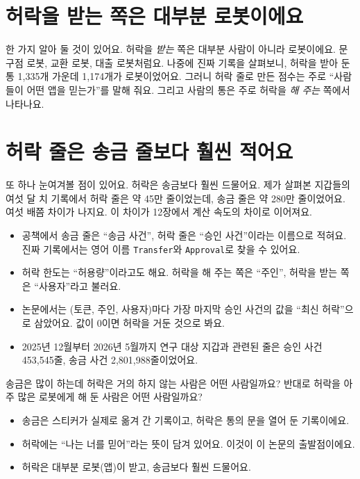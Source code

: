 \section{허락을 받는 쪽은 대부분 로봇이에요}

한 가지 알아 둘 것이 있어요.
허락을 \emph{받는} 쪽은 대부분 사람이 아니라 로봇이에요.
문구점 로봇, 교환 로봇, 대출 로봇처럼요.
나중에 진짜 기록을 살펴보니, 허락을 받아 둔 통 1,335개 가운데 1,174개가 로봇이었어요.
그러니 허락 줄로 만든 점수는 주로 “사람들이 어떤 앱을 믿는가”를 말해 줘요.
그리고 사람의 통은 주로 허락을 \emph{해 주는} 쪽에서 나타나요.

\section{허락 줄은 송금 줄보다 훨씬 적어요}

또 하나 눈여겨볼 점이 있어요.
허락은 송금보다 훨씬 드물어요.
제가 살펴본 지갑들의 여섯 달 치 기록에서 허락 줄은 약 45만 줄이었는데, 송금 줄은 약 280만 줄이었어요.
여섯 배쯤 차이가 나지요.
이 차이가 12장에서 계산 속도의 차이로 이어져요.

\begin{deeper}[진짜 용어]
\begin{itemize}
\item 공책에서 송금 줄은 “송금 사건”, 허락 줄은 “승인 사건”이라는 이름으로 적혀요. 진짜 기록에서는 영어 이름 \texttt{Transfer}와 \texttt{Approval}로 찾을 수 있어요.
\item 허락 한도는 “허용량”이라고도 해요. 허락을 해 주는 쪽은 “주인”, 허락을 받는 쪽은 “사용자”라고 불러요.
\item 논문에서는 (토큰, 주인, 사용자)마다 가장 마지막 승인 사건의 값을 “최신 허락”으로 삼았어요. 값이 0이면 허락을 거둔 것으로 봐요.
\item 2025년 12월부터 2026년 5월까지 연구 대상 지갑과 관련된 줄은 승인 사건 453,545줄, 송금 사건 2,801,988줄이었어요.
\end{itemize}
\end{deeper}

\begin{think}
송금은 많이 하는데 허락은 거의 하지 않는 사람은 어떤 사람일까요?
반대로 허락을 아주 많은 로봇에게 해 둔 사람은 어떤 사람일까요?
\end{think}

\begin{learned}
\begin{itemize}
\item 송금은 스티커가 실제로 옮겨 간 기록이고, 허락은 통의 문을 열어 둔 기록이에요.
\item 허락에는 “나는 너를 믿어”라는 뜻이 담겨 있어요. 이것이 이 논문의 출발점이에요.
\item 허락은 대부분 로봇(앱)이 받고, 송금보다 훨씬 드물어요.
\end{itemize}
\end{learned}
